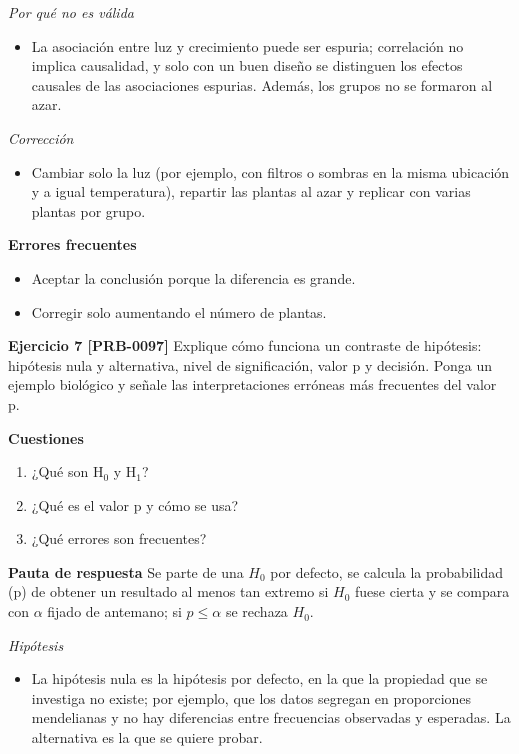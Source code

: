 \documentclass{book}
\begin{document}
\noindent\textit{Por qué no es válida}
\begin{itemize}
\item La asociación entre luz y crecimiento puede ser espuria; correlación no implica causalidad, y solo con un buen diseño se distinguen los efectos causales de las asociaciones espurias. Además, los grupos no se formaron al azar.
\end{itemize}

\noindent\textit{Corrección}
\begin{itemize}
\item Cambiar solo la luz (por ejemplo, con filtros o sombras en la misma ubicación y a igual temperatura), repartir las plantas al azar y replicar con varias plantas por grupo.
\end{itemize}

\noindent\textbf{Errores frecuentes}
\begin{itemize}
\item Aceptar la conclusión porque la diferencia es grande.
\item Corregir solo aumentando el número de plantas.
\end{itemize}

\noindent\textbf{Ejercicio 7 [PRB-0097]}
Explique cómo funciona un contraste de hipótesis: hipótesis nula y alternativa, nivel de significación, valor p y decisión. Ponga un ejemplo biológico y señale las interpretaciones erróneas más frecuentes del valor p.


\noindent\textbf{Cuestiones}
\begin{enumerate}
\item ¿Qué son H\({}_{0}\) y H\({}_{1}\)?
\item ¿Qué es el valor p y cómo se usa?
\item ¿Qué errores son frecuentes?
\end{enumerate}

\noindent\textbf{Pauta de respuesta}
Se parte de una \(H_{0}\) por defecto, se calcula la probabilidad (p) de obtener un resultado al menos tan extremo si \(H_{0}\) fuese cierta y se compara con \(\alpha\) fijado de antemano; si \(p \leq \alpha\) se rechaza \(H_{0}\).


\noindent\textit{Hipótesis}
\begin{itemize}
\item La hipótesis nula es la hipótesis por defecto, en la que la propiedad que se investiga no existe; por ejemplo, que los datos segregan en proporciones mendelianas y no hay diferencias entre frecuencias observadas y esperadas. La alternativa es la que se quiere probar.
\end{itemize}
\end{document}

